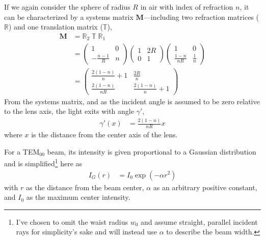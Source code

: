 \documentclass{article}
\begin{document}
	If we again consider the sphere of radius $R$ in air with index of refraction $n$, it can be characterized by a systems matrix $\mathbf{M}$---including two refraction matrices ($\mathbb{R}$) and one translation matrix ($\mathbb{T}$), \begin{align*}
		\mathbf{M} & = \mathbb{R}_2 \; \mathbb{T} \; \mathbb{R}_1 \\
			& = \begin{pmatrix}
				1 & 0 \\
				-\frac{n - 1}{R} & n
			\end{pmatrix}
			\begin{pmatrix}
				1 & 2R \\
				0 & 1
			\end{pmatrix}
			\begin{pmatrix}
				1 & 0 \\
				\frac{1 - n}{nR} & \frac{1}{n}
			\end{pmatrix} \\
			& = \begin{pmatrix}
				\frac{2(1-n)}{n} + 1 & \frac{2R}{n} \\
				\frac{2(1-n)}{nR} & \frac{2(1-n)}{n} + 1
			\end{pmatrix}
	\end{align*}
	From the systems matrix, and as the incident angle is assumed to be zero relative to the lens axis, the light exits with angle $\gamma'$, \begin{align}
		\gamma'(x) & = \frac{2(1-n)}{nR} x \label{eq:gamma}
	\end{align}
	where $x$ is the distance from the center axis of the lens.
	
	For a TEM$_{00}$ beam, its intensity is given proportional to a Gaussian distribution and is simplified\footnote{I've chosen to omit the waist radius $w_0$ and assume straight, parallel incident rays for simplicity's sake and will instead use $\alpha$ to describe the beam width.} here as \begin{align*}
		I_G(r) & = I_0 \exp(-\alpha r^2)
	\end{align*}
	with $r$ as the distance from the beam center, $\alpha$ as an arbitrary positive constant, and $I_0$ as the maximum center intensity.
	
\end{document}
